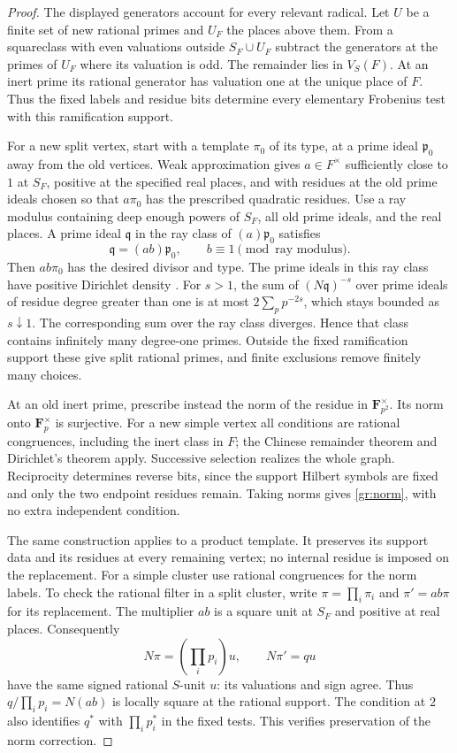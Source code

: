 \begin{proof}
The displayed generators account for every relevant radical.  Let $U$
be a finite set of new rational primes and $U_F$ the places above them.
From a squareclass with even valuations outside $S_F\cup U_F$ subtract
the generators at the primes of $U_F$ where its valuation is odd.  The
remainder lies in $V_S(F)$.  At an inert prime its rational generator has
valuation one at the unique place of $F$.  Thus the fixed labels and
residue bits determine every elementary Frobenius test with this
ramification support.

For a new split vertex, start with a template $\pi_0$ of its type, at a
prime ideal $\mathfrak p_0$ away from the old vertices.  Weak approximation
gives $a\in F^\times$ sufficiently close to $1$ at $S_F$, positive at
the specified real places, and with residues at the old prime ideals
chosen so that $a\pi_0$ has the prescribed quadratic residues.  Use a
ray modulus containing deep enough powers of $S_F$, all old prime ideals,
and the real places.  A prime ideal $\mathfrak q$ in the ray class of
$(a)\mathfrak p_0$ satisfies
\[
 \mathfrak q=(ab)\mathfrak p_0,\qquad
 b\equiv1\pmod{\text{ray modulus}}.
\]
Then $ab\pi_0$ has the desired divisor and type.  The prime ideals in
this ray class have positive Dirichlet density
\citep[Chapter~V, Theorem~2.5]{MilneCFT2020}.
For $s>1$, the sum of $(N\mathfrak q)^{-s}$ over prime ideals of
residue degree greater than one is at most $2\sum_p p^{-2s}$, which
stays bounded as $s\downarrow1$.  The corresponding sum over the ray
class diverges.  Hence that class contains infinitely many degree-one
primes.  Outside the fixed ramification support these give split rational
primes, and finite exclusions remove finitely many choices.

At an old inert prime, prescribe instead the norm of the residue in
$\mathbf F_{p^2}^\times$.  Its norm onto $\mathbf F_p^\times$ is
surjective.  For a new simple vertex all conditions are rational
congruences, including the inert class in $F$; the Chinese remainder
theorem and Dirichlet's theorem apply.  Successive selection realizes the
whole graph.  Reciprocity determines reverse bits, since the support
Hilbert symbols are fixed and only the two endpoint residues remain.
Taking norms gives \eqref{gr:norm}, with no extra independent condition.

The same construction applies to a product template.  It preserves its
support data and its residues at every remaining vertex; no internal
residue is imposed on the replacement.  For a simple cluster use rational
congruences for the norm labels.  To check the rational filter in a split
cluster, write $\pi=\prod_i\pi_i$ and $\pi'=ab\pi$ for its replacement.
The multiplier $ab$ is a square unit at $S_F$ and positive at real places.
Consequently
\[
 N\pi=(\prod_i p_i)u,\qquad N\pi'=q u
\]
have the same signed rational $S$-unit $u$: its valuations and sign agree.
Thus $q/\prod_i p_i=N(ab)$ is locally square at the rational support.
The condition at $2$ also identifies $q^*$ with $\prod_i p_i^*$ in the
fixed tests.  This verifies preservation of the norm correction.


\end{proof}
